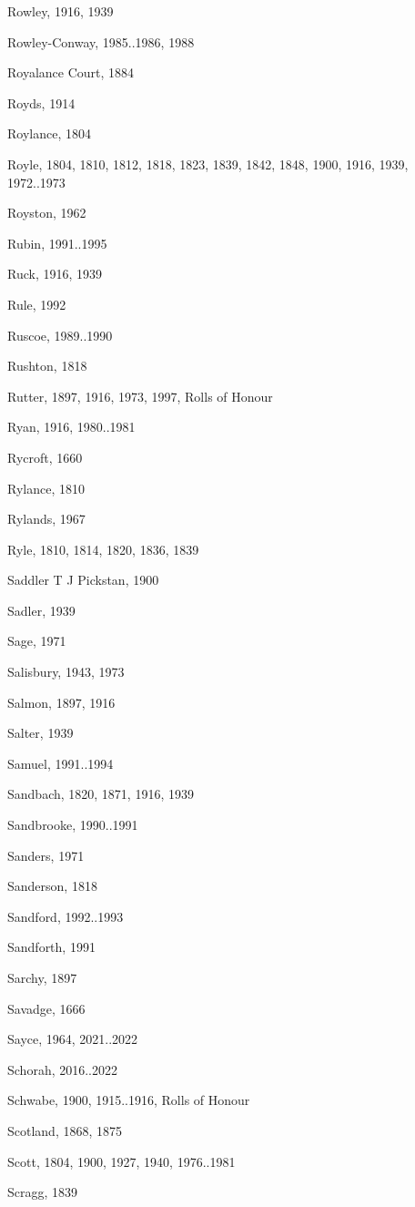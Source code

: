 \begin{theindex}
\item Rowley, 1916, 1939
\item Rowley-Conway, 1985..1986, 1988
\item Royalance Court, 1884
\item Royds, 1914
\item Roylance, 1804
\item Royle, 1804, 1810, 1812, 1818, 1823, 1839, 1842, 1848, 1900, 1916, 1939, 1972..1973
\item Royston, 1962
\item Rubin, 1991..1995
\item Ruck, 1916, 1939
\item Rule, 1992
\item Ruscoe, 1989..1990
\item Rushton, 1818
\item Rutter, 1897, 1916, 1973, 1997, Rolls of Honour
\item Ryan, 1916, 1980..1981
\item Rycroft, 1660
\item Rylance, 1810
\item Rylands, 1967
\item Ryle, 1810, 1814, 1820, 1836, 1839
\item Saddler T J Pickstan, 1900
\item Sadler, 1939
\item Sage, 1971
\item Salisbury, 1943, 1973
\item Salmon, 1897, 1916
\item Salter, 1939
\item Samuel, 1991..1994
\item Sandbach, 1820, 1871, 1916, 1939
\item Sandbrooke, 1990..1991
\item Sanders, 1971
\item Sanderson, 1818
\item Sandford, 1992..1993
\item Sandforth, 1991
\item Sarchy, 1897
\item Savadge, 1666
\item Sayce, 1964, 2021..2022
\item Schorah, 2016..2022
\item Schwabe, 1900, 1915..1916, Rolls of Honour
\item Scotland, 1868, 1875
\item Scott, 1804, 1900, 1927, 1940, 1976..1981
\item Scragg, 1839

\end{theindex}
